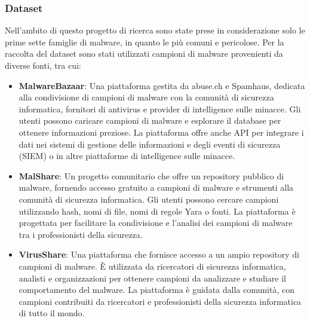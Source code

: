 \subsubsection{Dataset}
Nell'ambito di questo progetto di ricerca sono state prese in considerazione solo le prime sette famiglie di malware, in quanto le più comuni e pericolose. Per la raccolta del dataset sono stati utilizzati campioni di malware provenienti da diverse fonti, tra cui:
\begin{itemize}
    \item \textbf{MalwareBazaar}: Una piattaforma gestita da abuse.ch e Spamhaus, dedicata alla condivisione di campioni di malware con la comunità di sicurezza informatica, fornitori di antivirus e provider di intelligence sulle minacce. Gli utenti possono caricare campioni di malware e esplorare il database per ottenere informazioni preziose. La piattaforma offre anche API per integrare i dati nei sistemi di gestione delle informazioni e degli eventi di sicurezza (SIEM) o in altre piattaforme di intelligence sulle minacce.
    \item \textbf{MalShare}: Un progetto comunitario che offre un repository pubblico di malware, fornendo accesso gratuito a campioni di malware e strumenti alla comunità di sicurezza informatica. Gli utenti possono cercare campioni utilizzando hash, nomi di file, nomi di regole Yara o fonti. La piattaforma è progettata per facilitare la condivisione e l'analisi dei campioni di malware tra i professionisti della sicurezza.
    \item \textbf{VirusShare}: Una piattaforma che fornisce accesso a un ampio repository di campioni di malware. È utilizzata da ricercatori di sicurezza informatica, analisti e organizzazioni per ottenere campioni da analizzare e studiare il comportamento del malware. La piattaforma è guidata dalla comunità, con campioni contribuiti da ricercatori e professionisti della sicurezza informatica di tutto il mondo.
\end{itemize}

